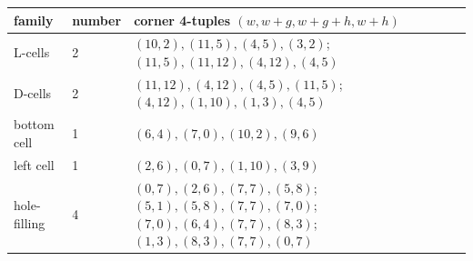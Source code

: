 \begin{tabular}{@{}llp{8.2cm}@{}}
\toprule family & number & corner 4-tuples $(w,w+g,w+g+h,w+h)$\\\midrule
L-cells & 2 & $(10,2),(11,5),(4,5),(3,2)$; $(11,5),(11,12),(4,12),(4,5)$\\
D-cells & 2 & $(11,12),(4,12),(4,5),(11,5)$; $(4,12),(1,10),(1,3),(4,5)$\\
bottom cell & 1 & $(6,4),(7,0),(10,2),(9,6)$\\
left cell & 1 & $(2,6),(0,7),(1,10),(3,9)$\\
hole-filling & 4 & $(0,7),(2,6),(7,7),(5,8)$; $(5,1),(5,8),(7,7),(7,0)$; $(7,0),(6,4),(7,7),(8,3)$; $(1,3),(8,3),(7,7),(0,7)$\\
\bottomrule\end{tabular}